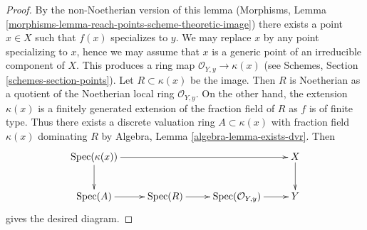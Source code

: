 \documentclass[10pt,a4paper]{amsart}
\theoremstyle{plain}
\theoremstyle{definition}
\theoremstyle{remark}
\numberwithin{equation}{subsection}
\def\Spec{\mathop{\mathrm{Spec}}}
\begin{document}
\begin{proof}
By the non-Noetherian version of this lemma
(Morphisms, Lemma \ref{morphisms-lemma-reach-points-scheme-theoretic-image})
there exists a point $x \in X$ such that $f(x)$ specializes to $y$.
We may replace $x$ by any point specializing to $x$, hence we may
assume that $x$ is a generic point of an irreducible component of $X$.
This produces a ring map $\mathcal{O}_{Y, y} \to \kappa(x)$
(see Schemes, Section \ref{schemes-section-points}).
Let $R \subset \kappa(x)$ be the image. Then $R$ is Noetherian as a quotient
of the Noetherian local ring $\mathcal{O}_{Y, y}$.
On the other hand, the extension $\kappa(x)$ is
a finitely generated extension of the fraction field of $R$
as $f$ is of finite type.
Thus there exists a discrete valuation ring $A \subset \kappa(x)$
with fraction field $\kappa(x)$ dominating $R$ by
Algebra, Lemma \ref{algebra-lemma-exists-dvr}. Then
$$
\xymatrix{
\Spec(\kappa(x)) \ar[d] \ar[rrr] & & & X \ar[d] \\
\Spec(A) \ar[r] & \Spec(R) \ar[r] & \Spec(\mathcal{O}_{Y, y}) \ar[r] & Y
}
$$
gives the desired diagram.
\end{proof}
\end{document}
